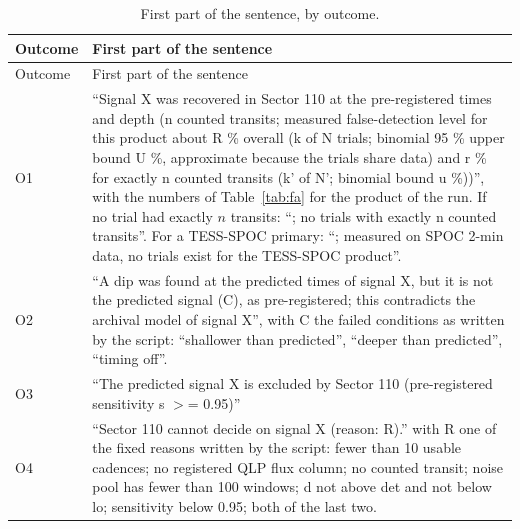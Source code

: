 \begin{longtable}{>{\raggedright\arraybackslash}p{}>{\raggedright\arraybackslash}p{}}
\caption{First part of the sentence, by outcome.\label{tab:sent1}}\\
\toprule
Outcome & First part of the sentence \\
\midrule
\endfirsthead
\toprule
Outcome & First part of the sentence \\
\midrule
\endhead
O1 & ``Signal X was recovered in Sector 110 at the pre-registered times and depth (n counted transits; measured
  false-detection level for this product about R \% overall (k of N trials; binomial 95 \% upper bound U \%, approximate
  because the trials share data) and r \% for exactly n counted transits (k' of N'; binomial bound u \%))'', with the
  numbers of Table~\ref{tab:fa} for the product of the run. If no trial had exactly $n$ transits: ``; no trials with
  exactly n counted transits''. For a TESS-SPOC primary: ``; measured on SPOC 2-min data, no trials exist for the
  TESS-SPOC product''. \\
O2 & ``A dip was found at the predicted times of signal X, but it is not the predicted signal (C), as pre-registered;
  this contradicts the archival model of signal X'', with C the failed conditions as written by the script: ``shallower
  than predicted'', ``deeper than predicted'', ``timing off''. \\
O3 & ``The predicted signal X is excluded by Sector 110 (pre-registered sensitivity s $>$= 0.95)'' \\
O4 & ``Sector 110 cannot decide on signal X (reason: R).'' with R one of the fixed reasons written by the script: fewer
  than 10 usable cadences; no registered QLP flux column; no counted transit; noise pool has fewer than 100 windows; d not
  above det and not below lo; sensitivity below 0.95; both of the last two. \\
\bottomrule
\end{longtable}

